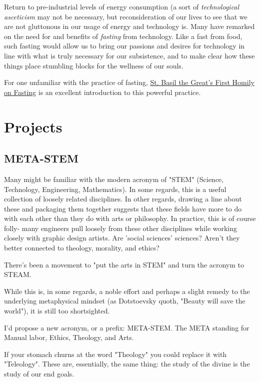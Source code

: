 \documentclass[letterpaper]{article}
\begin{document}
Return to pre-industrial levels of energy consumption (a sort of \textit{technological asceticism} may not be necessary, but reconsideration of our lives to see that we are not gluttonous in our usage of energy and technology is. Many have remarked on the need for and benefits of \textit{fasting} from technology. Like a fast from food, such fasting would allow us to bring our passions and desires for technology in line with what is truly necessary for our subsistence, and to make clear how these things place stumbling blocks for the wellness of our souls. 

For one unfamiliar with the practice of fasting, \href{http://rutgersnb.occministries.org/wp-content/uploads/2015/07/St.-Basil-the-Great%E2%80%99s-First-Homily-on-Fasting.pdf}{St. Basil the Great's First Homily on Fasting} is an excellent introduction to this powerful practice. 

\section{Projects}

\subsection{META-STEM}

Many might be familiar with the modern acronym of "STEM" (Science, Technology, Engineering, Mathematics). In some regards, this is a useful collection of loosely related disciplines. In other regards, drawing a line about these and packaging them together suggests that these fields have more to do with each other than they do with arts or philosophy. In practice, this is of course folly- many engineers pull loosely from these other disciplines while working closely with graphic design artists. Are 'social sciences' sciences? Aren't they better connected to theology, morality, and ethics?

There's been a movement to "put the arts in STEM" and turn the acronym to STEAM.

While this is, in some regards, a noble effort and perhaps a slight remedy to the underlying metaphysical mindset (as Dotstoevsky quoth, "Beauty will save the world"), it is still too shortsighted.

I'd propose a new acronym, or a prefix: META-STEM. The META standing for Manual labor, Ethics, Theology, and Arts.

If your stomach churns at the word "Theology" you could replace it with "Teleology". These are, essentially, the same thing: the study of the divine is the study of our end goals.
\end{document}
